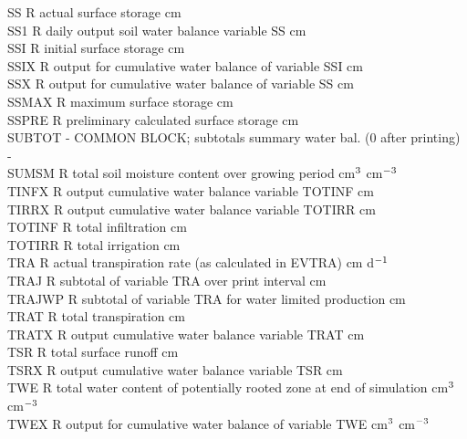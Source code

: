 \begin{tabbing}
SS\> \> R\> actual surface storage\> \> \> \> \> \> \> cm\\
SS1\> \> R\> daily output soil water balance variable SS\> \> \> \> \> \> \> cm\\
SSI\> \> R\> initial surface storage\> \> \> \> \> \> \> cm\\
SSIX\> \> R\> output for cumulative water balance of variable SSI\> \> \> \> \> \> \> cm\\
SSX\> \> R\> output for cumulative water balance of variable SS\> \> \> \> \> \> \> cm\\
SSMAX\> \> R\> maximum surface storage\> \> \> \> \> \> \> cm\\
SSPRE\> \> R \> preliminary calculated surface storage\> \> \> \> \> \> \> cm\\
SUBTOT\> \> -\> COMMON BLOCK; subtotals summary water bal. (0 after printing)\> \> \> \> \> \> \> -\\
SUMSM\> \> R\> total soil moisture content over growing period \> \> \> \> \> \> \> cm$^{{\rm 3}}$ cm$^{{\rm -3}}$\\
TINFX\> \> R\> output cumulative water balance variable TOTINF\> \> \> \> \> \> \> cm\\
TIRRX\> \> R\> output cumulative water balance variable TOTIRR\> \> \> \> \> \> \> cm\\
TOTINF\> \> R\> total infiltration\> \> \> \> \> \> \> cm\\
TOTIRR\> \> R\> total irrigation\> \> \> \> \> \> \> cm\\
TRA\> \> R\> actual transpiration rate (as calculated in EVTRA)\> \> \> \> \> \> \> cm d$^{{\rm -1}}$\\
TRAJ\> \> R\> subtotal of variable TRA over print interval\> \> \> \> \> \> \> cm\\
TRAJWP\> \> R\> subtotal of variable TRA for water limited production\> \> \> \> \> \> \> cm\\
TRAT\> \> R\> total transpiration\> \> \> \> \> \> \> cm\\
TRATX\> \> R\> output cumulative water balance variable TRAT\> \> \> \> \> \> \> cm\\
TSR\> \> R\> total surface runoff\> \> \> \> \> \> \> cm\\
TSRX\> \> R\> output cumulative water balance variable TSR\> \> \> \> \> \> \> cm\\
TWE\> \> R\> total water content of potentially rooted zone at end of simulation\> \> \> \> \> \> \> cm$^{{\rm 3}}$ cm$^{{\rm -3}}$\\
TWEX\> \> R\> output for cumulative water balance of variable TWE\> \> \> \> \> \> \> cm$^{{\rm 3}}$ cm$^{{\rm -3}}$\\

\end{tabbing}
